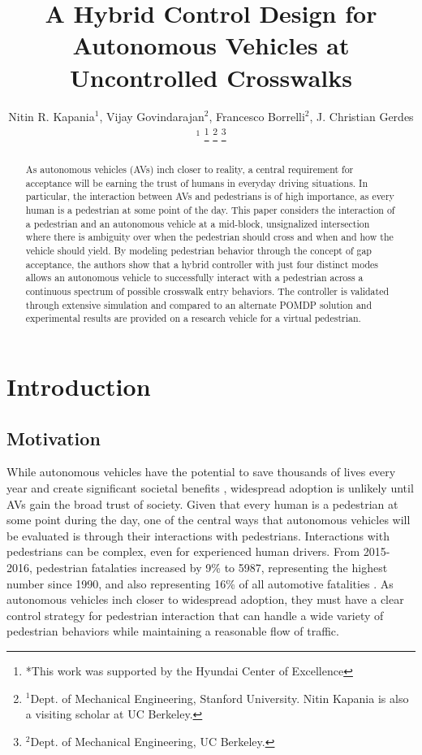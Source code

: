 \documentclass[letterpaper, 10 pt, conference]{ieeeconf} %
\title{\LARGE \bf
A Hybrid Control Design for Autonomous Vehicles at Uncontrolled Crosswalks}
\author{Nitin R. Kapania$^{1}$, Vijay Govindarajan$^{2}$, Francesco Borrelli$^{2}$, J. Christian Gerdes$^{1}$%
\thanks{*This work was supported by the Hyundai Center of Excellence}%
\thanks{$^{1}$Dept. of Mechanical Engineering, Stanford University. Nitin Kapania is also a visiting scholar at UC Berkeley.}%
\thanks{$^{2}$Dept. of Mechanical Engineering, UC Berkeley.}%
}
\begin{document}
\maketitle
\thispagestyle{empty}
\pagestyle{empty}


\begin{abstract}

As autonomous vehicles (AVs) inch closer to reality, a central requirement for acceptance will be earning the trust of humans in everyday driving situations. In particular, the interaction between AVs and pedestrians is of
high importance, as every human is a pedestrian at some point of the day. This paper considers the interaction of a pedestrian and an autonomous vehicle at a mid-block, unsignalized intersection where there is ambiguity
over when the pedestrian should cross and when and how the vehicle should yield. By modeling pedestrian behavior through the concept of gap acceptance, the authors show that a hybrid controller with just four distinct modes allows an autonomous vehicle to successfully interact with a pedestrian across a continuous spectrum of possible crosswalk entry behaviors. The controller is validated through extensive simulation and compared to an alternate POMDP solution and experimental results are provided on a research vehicle for a virtual pedestrian. 

\end{abstract}


\section{Introduction}

\subsection{Motivation}

While autonomous vehicles have the potential to save thousands of lives every year and create significant societal benefits \cite{Fagnant2015}, widespread adoption is unlikely until AVs gain the broad trust of society. Given that every human is a pedestrian at some point during the day, one of the central ways that autonomous vehicles will be evaluated is through their interactions with pedestrians. Interactions with pedestrians can be complex, even for experienced human drivers. From 2015-2016, pedestrian fatalaties increased by 9\% to 5987, representing the highest number since 1990, and also representing 16\% of all automotive fatalities \cite{HighwayTrafficSafetyAdministration2016}. As autonomous vehicles inch closer to widespread adoption, they must have a clear control strategy for pedestrian interaction that can handle a wide variety of pedestrian behaviors while maintaining a reasonable flow of traffic.  
\end{document}
